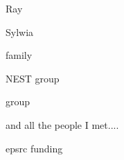 \documentclass[12pt,PhD,a4paper,pdftex]{muthesis}
\numberwithin{equation}{chapter} %
\begin{document}
Ray

Sylwia

family

NEST group

\oomph group

and all the people I met....

epsrc funding

\afterpreface
















\appendix






\printbibliography
\end{document}
